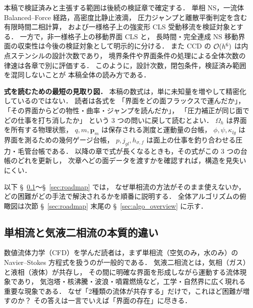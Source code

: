 本稿で検証済みと主張する範囲は後続の検証章で確定する．
単相 NS，一流体 Balanced--Force 経路，高密度比静止液滴，
圧力ジャンプと離散平衡判定を含む有限時間二相計算，
および一様格子上の強変形 CLS 受動移流を検証対象とする．
一方で，非一様格子上の移動界面 CLS と，
長時間・完全連成 NS 移動界面の収束性は今後の検証対象として明示的に分ける．
また CCD の $\mathcal{O}(h^6)$ は内点ステンシルの設計次数であり，
境界条件や界面条件の処理による全体次数の律速は各章で別に評価する．
このように，設計次数，閉包条件，検証済み範囲を混同しないことが
本稿全体の読み方である．

\noindent\textbf{式を読むための最短の見取り図．}
本稿の数式は，単に未知量を増やして精密化しているのではない．
読者は各式を
「界面をどの面フラックスで運んだか」，
「その界面からどの物性・曲率・ジャンプを読んだか」，
「圧力補正が同じ面でどの仕事を打ち消したか」
という 3 つの問いに戻して読むとよい．
$\Omega_h$ は界面を所有する物理状態，
$q,m,\bm{p}_m$ は保存される測度と運動量の台帳，
$\phi,\psi,\kappa_{lg}$ は界面を測るための幾何ゲージ台帳，
$p,j_{gl},h_{\sigma,f}$ は面上の仕事を釣り合わせる圧力・毛管台帳である．
以降の章で式が長くなるときも，その式がこの 3 つの台帳のどれを更新し，
次章へどの面データを渡すかを確認すれば，構造を見失いにくい．

以下 §~\ref{sec:why_hard}〜§~\ref{sec:roadmap} では，
なぜ単相流の方法がそのまま使えないか，どの困難がどの手法で解決されるかを順番に説明する．
全体アルゴリズムの俯瞰図は次節 §~\ref{sec:roadmap} 末尾の §~\ref{sec:algo_overview} に示す．

\subsection{単相流と気液二相流の本質的違い}
\label{sec:why_hard}

数値流体力学（CFD）を学んだ読者は，まず単相流（空気のみ，水のみ）の
Navier--Stokes 方程式を扱うのが一般的である．
気液二相流とは，気相（ガス）と液相（液体）が共存し，
その間に明確な界面を形成しながら運動する流体現象であり，
気泡塔・核沸騰・波浪・噴霧燃焼など，工学・自然界に広く現れる重要な現象である．
なぜ「2種類の流体が共存する」だけで，これほど困難が増すのか？
その答えは一言でいえば「界面の存在」に尽きる．

